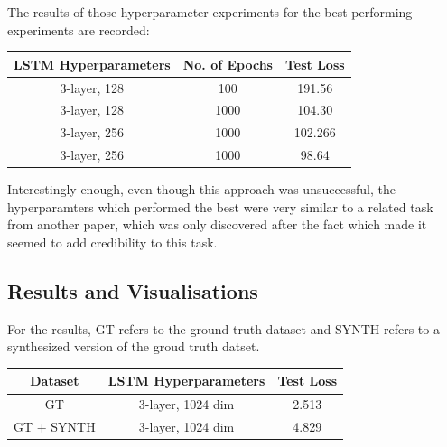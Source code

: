 The results of those hyperparameter experiments for the best
performing experiments are recorded:

{\small\begin{center}
    \begin{tabular} {  c | c | c  }
    \hline
    \textbf{LSTM Hyperparameters} & \textbf{No. of Epochs} & \textbf{Test Loss} \\
    \hline
    3-layer, 128 & 100 & 191.56 \\
    3-layer, 128 & 1000 & 104.30 \\
    3-layer, 256 & 1000 & 102.266 \\
    3-layer, 256 & 1000 & 98.64 \\
    \hline
    \end{tabular}
\end{center}}

Interestingly enough, even though this approach was unsuccessful,
the hyperparamters which performed the best were very similar to
a related task from another paper, which was only discovered after the
fact which made it seemed to add credibility to this task.

\subsection{Results and Visualisations}

For the results, GT refers to the ground truth dataset and SYNTH
refers to a synthesized version of the groud truth datset.

{\small\begin{center}
    \begin{tabular} {  c | c | c  }
    \hline
    \textbf{Dataset} & \textbf{LSTM Hyperparameters} & \textbf{Test Loss} \\
    \hline
    GT & 3-layer, 1024 dim & 2.513 \\
    GT + SYNTH & 3-layer, 1024 dim & 4.829 \\
    \hline
    \end{tabular}
\end{center}}


